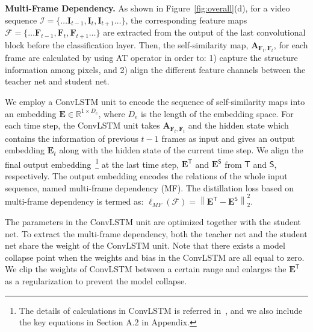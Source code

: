\documentclass[runningheads]{llncs}
\begin{document}
\noindent\textbf{Multi-Frame Dependency.} As shown in Figure~\ref{fig:overall}(d), for a video sequence $\mathcal{I}=\{\dots \mathbf{I}_{t-1},\mathbf{I}_{t},\mathbf{I}_{t+1}\dots\}$, the corresponding feature maps
$\mathcal{F}=\{\dots \mathbf{F}_{t-1},\mathbf{F}_{t},\mathbf{F}_{t+1}\dots\}$ are extracted from the output of the last convolutional block before the classification layer. Then, the self-similarity map, $\mathbf{A}_{\mathbf{F}_t,\mathbf{F}_{t}}$, for each frame are calculated by using AT operator in order to: 1) capture the structure information among pixels, and 2) align the different feature channels between the teacher net and student net.

We employ a ConvLSTM unit to encode the sequence of self-similarity maps into an embedding $\mathbf{E}\in \mathbb{R}^{1 \times  D_e}$, where $D_e$ is the length of the embedding space.
For each time step, the ConvLSTM unit takes $\mathbf{A}_{\mathbf{F}_t,\mathbf{F}_{t}}$ and the hidden state which contains the information of previous $t-1$ frames as input and gives an output embedding $\mathbf{E}_t$ along with the hidden state of the current time step. We align the final output embedding~\footnote{The details of calculations in ConvLSTM is referred in~\cite{ConvLSTM}, and we also include the key equations in Section A.2 in Appendix.} at the last time step,   $\mathbf{E}^{\mathsf{T}}$ and  $\mathbf{E}^{\mathsf{S}}$ from $\mathsf{T}$ and $\mathsf{S}$, respectively. The output embedding encodes the relations of the whole input sequence, named multi-frame dependency (MF). The distillation loss based on multi-frame dependency is termed as: $    \ell_{MF}(\mathcal{F})=\left \|\mathbf{E}^{\mathsf{T}}-\mathbf{E}^{\mathsf{S}}\right \|_{2}^{2}$.



The parameters in the ConvLSTM unit are optimized together with the student net. To extract the multi-frame dependency, both the teacher net and the student net share the weight of the ConvLSTM unit. Note that there exists a model collapse point when the weights and bias in the ConvLSTM are all equal to zero. We clip the weights of ConvLSTM between a certain range and enlarges the $\mathbf{E}^{\mathsf{T}}$ as a regularization to prevent the model collapse.
\end{document}
